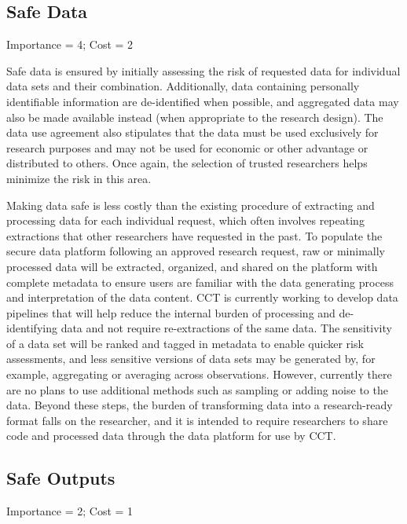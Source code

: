 \hypertarget{safe-data-5}{%
\subsection{Safe Data}\label{safe-data-5}}

Importance = 4; Cost = 2

Safe data is ensured by initially assessing the risk of requested data for individual data sets and their combination. Additionally, data containing personally identifiable information are de-identified when possible, and aggregated data may also be made available instead (when appropriate to the research design). The data use agreement also stipulates that the data must be used exclusively for research purposes and may not be used for economic or other advantage or distributed to others. Once again, the selection of trusted researchers helps minimize the risk in this area.

Making data safe is less costly than the existing procedure of extracting and processing data for each individual request, which often involves repeating extractions that other researchers have requested in the past. To populate the secure data platform following an approved research request, raw or minimally processed data will be extracted, organized, and shared on the platform with complete metadata to ensure users are familiar with the data generating process and interpretation of the data content. CCT is currently working to develop data pipelines that will help reduce the internal burden of processing and de-identifying data and not require re-extractions of the same data. The sensitivity of a data set will be ranked and tagged in metadata to enable quicker risk assessments, and less sensitive versions of data sets may be generated by, for example, aggregating or averaging across observations. However, currently there are no plans to use additional methods such as sampling or adding noise to the data. Beyond these steps, the burden of transforming data into a research-ready format falls on the researcher, and it is intended to require researchers to share code and processed data through the data platform for use by CCT.

\hypertarget{safe-outputs-5}{%
\subsection{Safe Outputs}\label{safe-outputs-5}}

Importance = 2; Cost = 1

